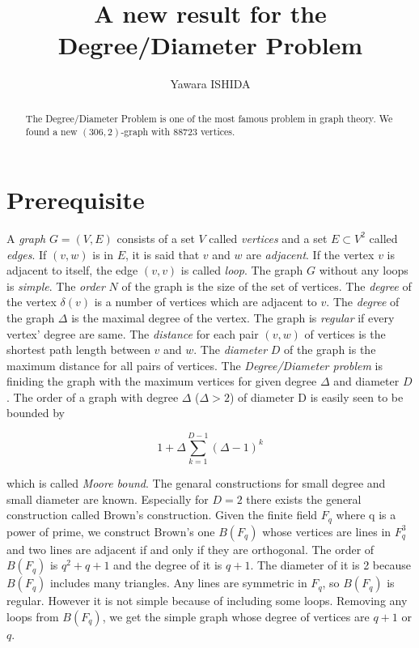 \documentclass{article}
\title{A new result for the Degree/Diameter Problem}
\author{Yawara ISHIDA}
\begin{document}
\maketitle
\begin{abstract}
The Degree/Diameter Problem is one of the most famous problem in graph theory. We found a new $(306,2)$-graph with $88723$ vertices.
\end{abstract}

\section{Prerequisite}
A {\it graph} $G=(V,E)$ consists of a set $V$ called {\it vertices} and a set $E \subset V^2$ called {\it edges}.
If $(v,w)$ is in $E$, it is said that $v$ and $w$ are {\it adjacent}. 
If the vertex $v$ is adjacent to itself, the edge $(v,v)$ is called {\it loop}.
The graph $G$ without any loops is {\it simple}.
The {\it order} $N$ of the graph is the size of the set of vertices. 
The {\it degree} of the vertex $\delta(v)$ is a number of vertices which are adjacent to $v$. 
The {\it degree} of the graph $\Delta$ is the maximal degree  of the vertex.
The graph is {\it regular} if every vertex' degree are same.
The {\it distance} for each pair $(v,w)$ of vertices is the shortest path length between $v$ and $w$. 
The {\it diameter} $D$ of the graph is the  maximum distance for all pairs of vertices. 
The {\it Degree/Diameter problem} is finiding the graph with the maximum vertices for given degree $\Delta$ and diameter $D$. 
The order of a graph with degree $\Delta$ ($\Delta > 2$) of diameter D is easily seen to be bounded by 

\[ 1 + \Delta \sum_{k=1}^{D-1} (\Delta - 1)^k\]

which is called {\it Moore bound}.
The genaral constructions for small degree and small diameter are known. Especially for $D=2$ there exists the general construction called Brown's construction.
Given the finite field $F_q$ where q is a power of prime, we construct Brown's one $B(F_q)$ whose vertices are lines in $F_q^3$ and two lines are adjacent if and only if they are orthogonal. The order of $B(F_q)$ is $q^2+q+1$ and the degree of it is $q+1$. The diameter of it is 2 because $B(F_q)$ includes many triangles. Any lines are symmetric in $F_q$, so $B(F_q)$ is regular. However it is not simple because of including some loops. Removing any loops from $B(F_q)$, we get the simple graph whose degree of vertices are $q+1$ or $q$. 
\end{document}
